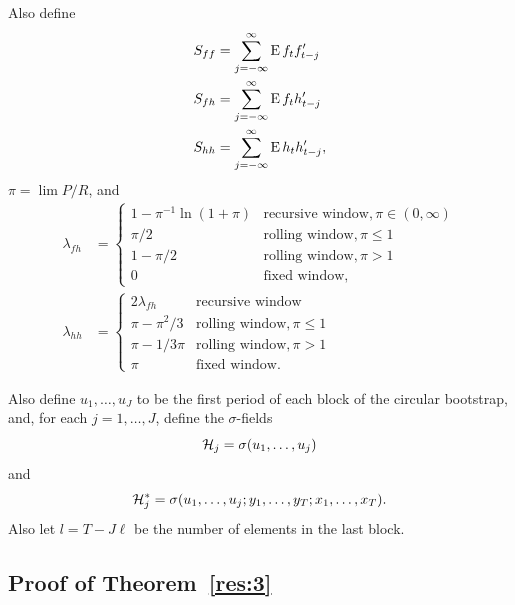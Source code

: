 \documentclass[12pt,fleqn]{article}
\begin{document}
Also define
\begin{align*}
  S_{ff} &= \sum_{j=-\infty}^\infty \operatorname{E} f_t f_{t-j}' \\
  S_{fh} &= \sum_{j=-\infty}^\infty \operatorname{E} f_t h_{t-j}' \\
  S_{hh} &= \sum_{j=-\infty}^\infty \operatorname{E} h_t h_{t-j}',
\end{align*}
$\pi = \lim P/R$, and
\begin{align*}
  \lambda_{fh} &=
  \begin{cases}
    1 - \pi^{-1} \ln(1 + \pi) & \text{recursive window}, \pi \in (0, \infty) \\
    \pi / 2 & \text{rolling window}, \pi \leq 1 \\
    1 - \pi / 2 & \text{rolling window}, \pi > 1 \\
    0 & \text{fixed window},
  \end{cases} \\
  \lambda_{hh} &=
  \begin{cases}
    2 \lambda_{fh} & \text{recursive window} \\
    \pi - \pi^2/3 & \text{rolling window}, \pi \leq 1 \\
    \pi - 1/3\pi & \text{rolling window} , \pi > 1 \\
    \pi & \text{fixed window}.
  \end{cases}
\end{align*}

Also define $u_1,\dots,u_J$ to be the first period of each
block of the circular bootstrap, and, for each $j = 1,\dots,J$,
define the $\sigma$-fields
\[
\mathcal{H}_j = \sigma(u_1,\dots,u_j)
\]
and
\[
\mathcal{H}_j^* = \sigma(u_1,\dots,u_j; y_1,\dots,y_T; x_1,\dots,x_T).
\]
Also let $l = T - J \ell$ be the number of elements in the last block.

\newcommand{\WesA}[1][]{\oclt{t}
  (F_t^{#1} - \E^{#1} F_t^{#1}) B^{#1} H_t^{#1}}
\newcommand{\WesB}[1][]{\tfrac{1}{\sqrt{P}} \E^{#1} F_t^{#1} \osum{t} (B_t^{#1} -
  B^{#1}) H_t^{#1}}
\newcommand{\WesC}[1][]{\oclt{t}
  (F_t^{#1} - \E^{#1} F_t^{#1}) (B_t^{#1} - B^{#1}) H_t^{#1}}

\subsection*{Proof of Theorem~\ref{res:3}}
\end{document}
